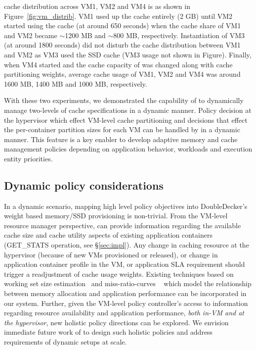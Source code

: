 \dd{} cache distribution across VM1, VM2 and VM4 is as shown in
Figure~\ref{fig:vm_distrib}.
%
VM1 used up the \dd{} cache entirely (2 GB) until VM2 started
using the cache (at around 650 seconds) when the cache share of
VM1 and VM2 became $\sim$1200 MB and $\sim$800 MB, respectively.
%
Instantiation of VM3 (at around 1800 seconds) did not disturb the cache
distribution between VM1 and VM2 as VM3 used the SSD cache (VM3 usage
not shown in Figure). 
%
Finally, when VM4 started and the cache capacity of \dd{} was changed 
along with cache partitioning weights, 
average cache usage of VM1, VM2 and VM4 was  
around 1600 MB, 1400 MB and 1000 MB, respectively.


With these two experiments, we demonstrated the capability of \dd{}
to dynamically manage two-levels of cache specifications in a
dynamic manner. Policy decision at the hypervisor which effect
VM-level cache partitioning and decisions that effect the
per-container partition sizes for each VM can be handled by \dd{}
in a dynamic manner. This feature is a key enabler to develop
adaptive memory and cache management policies depending
on application behavior, workloads and execution entity priorities.
%
\subsection{Dynamic policy considerations}
%
In a dynamic scenario, mapping high level policy objectives into DoubleDecker's
weight based memory/SSD provisioning is non-trivial.
%
From the VM-level resource manager perspective, \dd{} can provide 
information regarding the available cache size and cache utility aspects
of existing application containers (GET\_STATS operation, see \S\ref{sec:impl}).
%
Any change in caching resource at the hypervisor (because of
new VMs provisioned or released), or change in application container profile in
the VM, or application SLA requirement
should trigger a readjustment of \dd{} cache usage weights.
%
%
Existing techniques based on working set size estimation~\cite{wss, shards, tws} 
and miss-ratio-curves ~\cite{mrc,membal,centaur} which model the relationship between
memory allocation and application performance can be incorporated in our system.
%
Further, given the VM-level policy controller's access to information 
regarding resource availability and application performance, {\em both in-VM and
at the hypervisor}, new holistic policy directions can be explored.
%
We envision immediate future work of \dd{} to design such
holistic policies and
address requirements of dynamic setups at scale.
%

